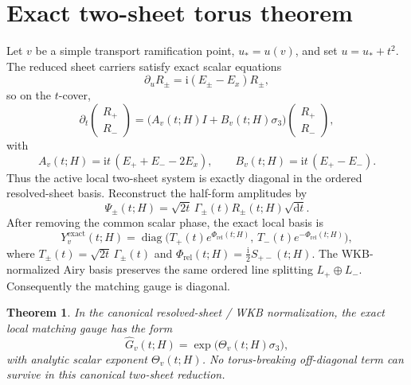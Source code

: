 \documentclass[11pt]{article}
\newtheorem{theorem}{Theorem}
\newcommand{\ii}{\mathrm{i}}
\newcommand{\dd}{\mathrm{d}}
\newcommand{\hatG}{\widehat G}
\newcommand{\diag}{\operatorname{diag}}
\begin{document}
\section{Exact two-sheet torus theorem}
Let $v$ be a simple transport ramification point, $u_*=u(v)$, and set $u=u_*+t^2$. The reduced sheet carriers satisfy exact scalar equations
\begin{equation}
 \partial_uR_\pm=\ii(E_\pm-E_x)R_\pm,
\end{equation}
so on the $t$-cover,
\begin{equation}
 \partial_t\begin{pmatrix}R_+\\R_-\end{pmatrix}=
 \bigl(A_v(t;H)I+B_v(t;H)\sigma_3\bigr)
 \begin{pmatrix}R_+\\R_-\end{pmatrix},
\end{equation}
with
\begin{equation}
 A_v(t;H)=\ii t\,(E_++E_--2E_x),\qquad B_v(t;H)=\ii t\,(E_+-E_-).
\end{equation}
Thus the active local two-sheet system is exactly diagonal in the ordered resolved-sheet basis. Reconstruct the half-form amplitudes by
\begin{equation}
 \Psi_\pm(t;H)=\sqrt{2t}\,\Gamma_\pm(t)R_\pm(t;H)\sqrt{\dd t}.
\end{equation}
After removing the common scalar phase, the exact local basis is
\begin{equation}
 Y_v^{\mathrm{exact}}(t;H)=\diag\bigl(T_+(t)e^{\Phi_{\mathrm{rel}}(t;H)},\,T_-(t)e^{-\Phi_{\mathrm{rel}}(t;H)}\bigr),
\end{equation}
where $T_\pm(t)=\sqrt{2t}\,\Gamma_\pm(t)$ and $\Phi_{\mathrm{rel}}(t;H)=\frac{\ii}{2}S_{+-}(t;H)$. The WKB-normalized Airy basis preserves the same ordered line splitting $L_+\oplus L_-$. Consequently the matching gauge is diagonal.

\begin{theorem}
In the canonical resolved-sheet / WKB normalization, the exact local matching gauge has the form
\begin{equation}
 \hatG_v(t;H)=\exp\!\bigl(\Theta_v(t;H)\sigma_3\bigr),
\end{equation}
with analytic scalar exponent $\Theta_v(t;H)$. No torus-breaking off-diagonal term can survive in this canonical two-sheet reduction.
\end{theorem}
\end{document}
